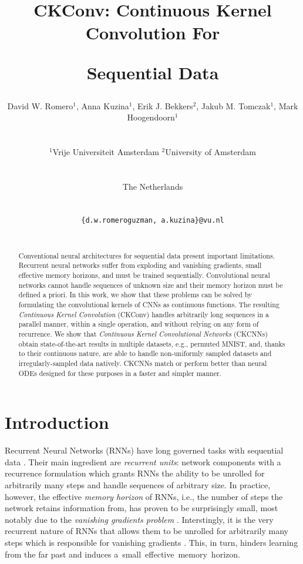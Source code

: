 \documentclass{article}
\title{CKConv: Continuous Kernel Convolution For \centerline{Sequential Data}}
\author{\centerline{David W. Romero$^{1}$, Anna Kuzina$^{1}$, Erik J. Bekkers$^{2}$, Jakub M. Tomczak$^{1}$, Mark Hoogendoorn$^{1}$}\\
    \centerline{${^1}$\hspace{0.5mm}Vrije Universiteit Amsterdam \quad $^{2}$\hspace{0.5mm}University of Amsterdam}\\
  \centerline{The Netherlands}\\
  \centerline{\texttt{\{d.w.romeroguzman, a.kuzina\}@vu.nl}}\\
}
\begin{document}
\maketitle

\begin{abstract}
   Conventional neural architectures for sequential data present important limitations. Recurrent neural networks suffer from exploding and vanishing gradients, small effective memory horizons, and must be trained sequentially. Convolutional neural networks cannot handle sequences of unknown size and their memory horizon must be defined a priori. In this work, we show that these problems can be solved by formulating the convolutional kernels of CNNs as continuous functions. The resulting \textit{Continuous Kernel Convolution} (CKConv) handles arbitrarily long sequences in a parallel manner, within a single operation, and without relying on any form of recurrence. We show that \textit{Continuous Kernel Convolutional Networks} (CKCNNs) obtain state-of-the-art results in multiple datasets, e.g., permuted MNIST, and, thanks to their continuous nature, are able to handle non-uniformly sampled datasets and irregularly-sampled data natively. CKCNNs match or perform better than neural ODEs designed for these purposes in a faster and simpler manner.
\end{abstract}

\vspace{-3mm}
\section{Introduction}
\vspace{-1mm}
Recurrent Neural Networks (RNNs) have long governed tasks with sequential data \citep{rumelhart1985learning, hochreiter1997long, chung2014empirical}. Their main ingredient are \textit{recurrent units}: network components with a recurrence formulation which grants RNNs the ability to be unrolled for arbitrarily many steps and handle sequences of arbitrary size. In practice, however, the effective \textit{memory horizon} of RNNs, i.e., the number of steps the network retains information from, has proven to be surprisingly small, most notably due to the \textit{vanishing gradients problem} \citep{hochreiter1991untersuchungen, bengio1994learning}. Interstingly, it is the very recurrent nature of RNNs that allows them to be unrolled for arbitrarily many steps which is responsible for vanishing gradients \citep{pascanu2013difficulty}. This, in turn, hinders learning from the far past and induces a~small~effective~memory~horizon.
\end{document}
